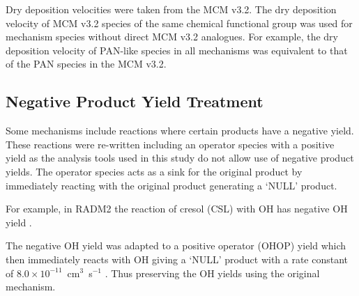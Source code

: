 Dry deposition velocities were taken from the MCM v3.2. 
The dry deposition velocity of MCM v3.2 species of the same chemical functional group was used for mechanism species without direct MCM v3.2 analogues. 
For example, the dry deposition velocity of PAN-like species in all mechanisms was equivalent to that of the PAN species in the MCM v3.2.

\subsection{Negative Product Yield Treatment}

Some mechanisms include reactions where certain products have a negative yield. 
These reactions were re-written including an operator species with a positive yield as the analysis tools used in this study do not allow use of negative product yields. 
The operator species acts as a sink for the original product by immediately reacting with the original product generating a `NULL' product. 

For example, in RADM2 the reaction of cresol (CSL) with OH has negative OH yield .
\begin{reactionlist}
\end{reactionlist}
The negative OH yield was adapted to a positive operator (OHOP) yield  which then immediately reacts with OH giving a `NULL' product with a rate constant of \mbox{$8.0 \times 10^{-11}$ cm$^3$ s$^{-1}$} . 
Thus preserving the OH yields using the original mechanism.
\begin{reactionlist}
\end{reactionlist}
